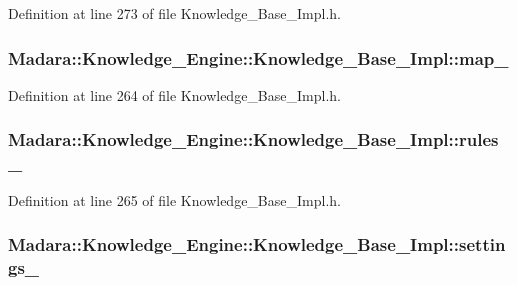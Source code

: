 Definition at line 273 of file Knowledge\_\-Base\_\-Impl.h.

\hypertarget{classMadara_1_1Knowledge__Engine_1_1Knowledge__Base__Impl_a686065198ca0023bcb6271d00c7873d0}{
\subsubsection[{map\_\-}]{ {\bf Madara::Knowledge\_\-Engine::Knowledge\_\-Base\_\-Impl::map\_\-}}}
\label{d3/d3c/classMadara_1_1Knowledge__Engine_1_1Knowledge__Base__Impl_a686065198ca0023bcb6271d00c7873d0}


Definition at line 264 of file Knowledge\_\-Base\_\-Impl.h.

\hypertarget{classMadara_1_1Knowledge__Engine_1_1Knowledge__Base__Impl_a134e1ce4a1e1a7e7611f19c55d27fb9d}{
\subsubsection[{rules\_\-}]{ {\bf Madara::Knowledge\_\-Engine::Knowledge\_\-Base\_\-Impl::rules\_\-}}}
\label{d3/d3c/classMadara_1_1Knowledge__Engine_1_1Knowledge__Base__Impl_a134e1ce4a1e1a7e7611f19c55d27fb9d}


Definition at line 265 of file Knowledge\_\-Base\_\-Impl.h.

\hypertarget{classMadara_1_1Knowledge__Engine_1_1Knowledge__Base__Impl_a95afcfeb28f9262b0ede5954111a706b}{
\subsubsection[{settings\_\-}]{ {\bf Madara::Knowledge\_\-Engine::Knowledge\_\-Base\_\-Impl::settings\_\-}}}
\label{d3/d3c/classMadara_1_1Knowledge__Engine_1_1Knowledge__Base__Impl_a95afcfeb28f9262b0ede5954111a706b}


